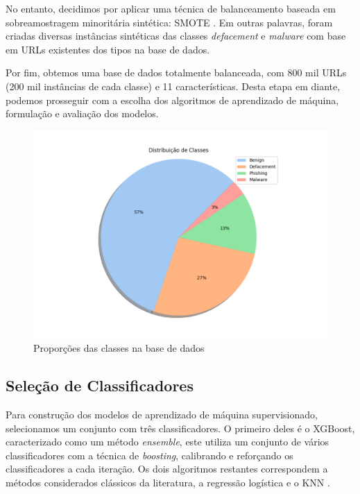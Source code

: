 \documentclass[manuscript,screen,review]{acmart}
\begin{document}
No entanto, decidimos por aplicar uma técnica de balanceamento baseada em sobreamostragem minoritária sintética: SMOTE \cite{DBLP:journals/corr/abs-1106-1813}. Em outras palavras, foram criadas diversas instâncias sintéticas das classes \emph{defacement} e \emph{malware} com base em URLs existentes dos tipos na base de dados.

Por fim, obtemos uma base de dados totalmente balanceada, com 800 mil URLs (200 mil instâncias de cada classe) e 11 características. Desta etapa em diante, podemos prosseguir com a escolha dos algoritmos de aprendizado de máquina, formulação e avaliação dos modelos.

\begin{figure}[H]
    \centering
    \includegraphics[width=1\textwidth]{pic/class.pdf}
    \caption{Proporções das classes na base de dados}
    \label{fig:exampleFig2}
\end{figure}

\subsection{Seleção de Classificadores}

Para construção dos modelos de aprendizado de máquina supervisionado, selecionamos um conjunto com três classificadores. O primeiro deles é o XGBoost, caracterizado como um método \emph{ensemble}, este utiliza um conjunto de vários classificadores com a técnica de \emph{boosting}, calibrando e reforçando os classificadores a cada iteração. Os dois algoritmos restantes correspondem a métodos considerados clássicos da literatura, a regressão logística e o KNN \cite{fix1951discriminatory}.
\end{document}
